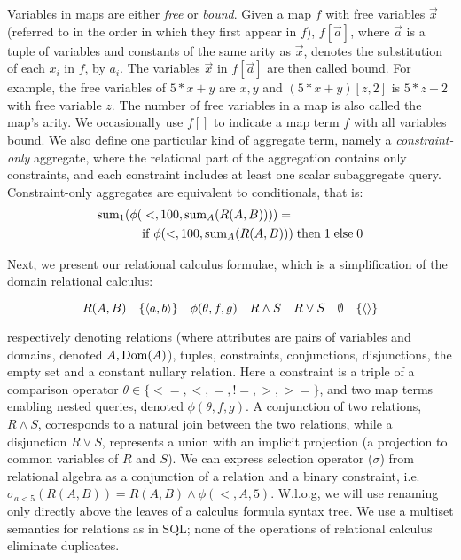 Variables in maps are either {\em free} or {\em bound}.
Given a map $f$ with free variables $\vec{x}$ (referred to in the order in which
they first appear in $f$), $f[\vec{a}]$, where $\vec{a}$ is a tuple of variables
and constants of the same arity as $\vec{x}$, denotes the substitution of each
$x_i$ in $f$, by $a_i$. The variables $\vec{x}$ in $f[\vec{a}]$ are then called
bound.  For example, the free variables of $5 * x + y$ are $x,y$ and $(5 * x +
y)[z, 2]$ is $5 * z + 2$ with free variable $z$.  The number of free variables
in a map is also called the map's arity.  We occasionally use $f[]$ to indicate
a map term $f$ with all variables bound.
We also define one particular kind of aggregate term, namely a
\textit{constraint-only} aggregate, where the relational part of the aggregation
contains only constraints, and each constraint includes at least one scalar
subaggregate query. Constraint-only aggregates are equivalent to conditionals,
that is:
\begin{align*}
\mathrm{sum}_{1}(\phi( & <,100,\mathrm{sum}_{A}(R(A,B)))) =\\
& \mathrm{if} \; \phi(<,100,\mathrm{sum}_{A}(R(A,B))) \; \mathrm{then} \; 1 \; \mathrm{else} \; 0
\end{align*}

Next, we present our relational calculus formulae, which is a simplification of
the domain relational calculus:

\[
R(A,B)
\quad
\{{\langle a,b\rangle}\}
\quad
\phi(\theta,f,g)
\quad
R \wedge S
\quad
R \vee S
\quad
\emptyset
\quad
\{{\langle\rangle}\}
\]

\noindent respectively denoting relations (where attributes are pairs of
variables and domains, denoted $A, \mathrm{Dom}(A)$), tuples, constraints, conjunctions,
disjunctions, the empty set and a constant nullary relation. Here a constraint
is a triple of a comparison operator $\theta \in \{<=,<,=,!=,>,>=\}$, and two
map terms enabling nested queries, denoted $\phi(\theta, f, g)$.  A conjunction
of two relations, $R \wedge S$, corresponds to a natural join between the two
relations, while a disjunction $R \vee S$, represents a union with an implicit
projection (a projection to common variables of $R$ and $S$).
We can express selection operator ($\sigma$) from relational algebra as a
conjunction of a relation and a binary constraint, i.e.  $\sigma_{a<5}(R(A,B))
= R(A,B) \wedge \phi(<,A,5)$.  W.l.o.g, we will use renaming only directly above
the leaves of a calculus formula syntax tree.  We use a multiset semantics for
relations as in SQL; none of the operations of relational calculus eliminate
duplicates.


